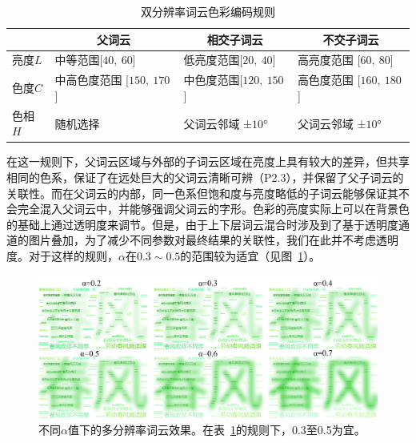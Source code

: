 \begin{table}[htbp]
		 \caption{双分辨率词云色彩编码规则}
		 \label{tab:color_rule}
	\begin{tabular}{llll}

		\toprule
		&\multicolumn{1}{c}{父词云} & \multicolumn{1}{c}{相交子词云} & \multicolumn{1}{c}{不交子词云} \\
		\midrule
		亮度$L$ & 中等范围[$40,\  60$]    &   低亮度范围[$20,\  40$]     &    高亮度范围 [$60,\  80$]   \\
		色度$C$ &   中高色度范围 [$150,\  170$]  & 中色度范围[$120, \ 150$]     &  高色度范围 [$160,\  180$]       \\
		色相$H$ &  随机选择   &  父词云邻域 ±$10$°     &       父词云邻域  ±$10$°\\
		\bottomrule
	\end{tabular}
\vspace{-0.2cm}
\end{table}
在这一规则下，父词云区域与外部的子词云区域在亮度上具有较大的差异，但共享相同的色系，保证了在远处巨大的父词云清晰可辨（P2.3），并保留了父子词云的关联性。而在父词云的内部，同一色系但饱和度与亮度略低的子词云能够保证其不会完全混入父词云中，并能够强调父词云的字形。色彩的亮度实际上可以在背景色的基础上通过透明度来调节。但是，由于上下层词云混合时涉及到了基于透明度通道的图片叠加，为了减少不同参数对最终结果的关联性，我们在此并不考虑透明度。对于这样的规则，$\alpha$在$0.3\sim 0.5$的范围较为适宜（见图~\ref{fig:alpha_comparison}）。
\vspace{-0.3cm}
\begin{figure}[htbp]
	\centering
	\includegraphics[width=\textwidth]{figures/alpha_comparison.png}
	\caption{不同$\alpha$值下的多分辨率词云效果。在表~\ref{tab:color_rule}的规则下，0.3至0.5为宜。}
	\label{fig:alpha_comparison}
\end{figure}
\vspace{-0.2cm}

